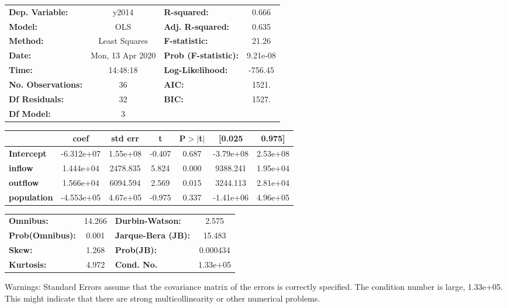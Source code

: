 \begin{center}
\begin{tabular}{lclc}
\toprule
\textbf{Dep. Variable:}    &      y2014       & \textbf{  R-squared:         } &     0.666   \\
\textbf{Model:}            &       OLS        & \textbf{  Adj. R-squared:    } &     0.635   \\
\textbf{Method:}           &  Least Squares   & \textbf{  F-statistic:       } &     21.26   \\
\textbf{Date:}             & Mon, 13 Apr 2020 & \textbf{  Prob (F-statistic):} &  9.21e-08   \\
\textbf{Time:}             &     14:48:18     & \textbf{  Log-Likelihood:    } &   -756.45   \\
\textbf{No. Observations:} &          36      & \textbf{  AIC:               } &     1521.   \\
\textbf{Df Residuals:}     &          32      & \textbf{  BIC:               } &     1527.   \\
\textbf{Df Model:}         &           3      & \textbf{                     } &             \\
\bottomrule
\end{tabular}
\begin{tabular}{lcccccc}
                    & \textbf{coef} & \textbf{std err} & \textbf{t} & \textbf{P$> |$t$|$} & \textbf{[0.025} & \textbf{0.975]}  \\
\midrule
\textbf{Intercept}  &   -6.312e+07  &     1.55e+08     &    -0.407  &         0.687        &    -3.79e+08    &     2.53e+08     \\
\textbf{inflow}     &    1.444e+04  &     2478.835     &     5.824  &         0.000        &     9388.241    &     1.95e+04     \\
\textbf{outflow}    &    1.566e+04  &     6094.594     &     2.569  &         0.015        &     3244.113    &     2.81e+04     \\
\textbf{population} &   -4.553e+05  &     4.67e+05     &    -0.975  &         0.337        &    -1.41e+06    &     4.96e+05     \\
\bottomrule
\end{tabular}
\begin{tabular}{lclc}
\textbf{Omnibus:}       & 14.266 & \textbf{  Durbin-Watson:     } &    2.575  \\
\textbf{Prob(Omnibus):} &  0.001 & \textbf{  Jarque-Bera (JB):  } &   15.483  \\
\textbf{Skew:}          &  1.268 & \textbf{  Prob(JB):          } & 0.000434  \\
\textbf{Kurtosis:}      &  4.972 & \textbf{  Cond. No.          } & 1.33e+05  \\
\bottomrule
\end{tabular}
\end{center}

Warnings: \newline
 [1] Standard Errors assume that the covariance matrix of the errors is correctly specified. \newline
 [2] The condition number is large, 1.33e+05. This might indicate that there are \newline
 strong multicollinearity or other numerical problems.